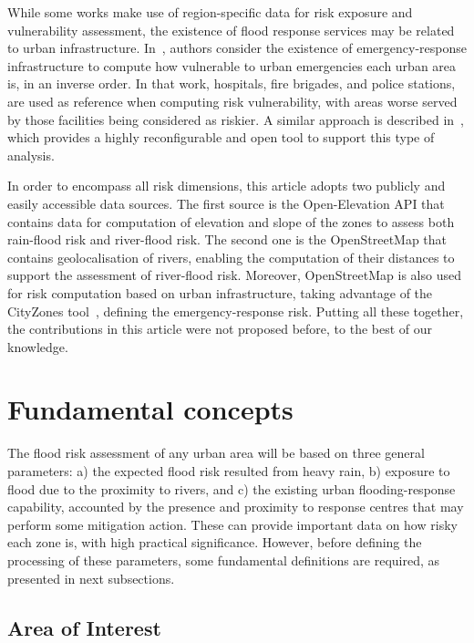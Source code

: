 \begin{refsection}
While some works make use of region-specific data for risk exposure and vulnerability assessment, the existence of flood response services may be related to urban infrastructure. In~\cite{sensorsposition}, authors consider the existence of emergency-response infrastructure to compute how vulnerable to urban emergencies each urban area is, in an inverse order. In that work, hospitals, fire brigades, and police stations, are used as reference when computing risk vulnerability, with areas worse served by those facilities being considered as riskier. A similar approach is described in~\cite{cityzones}, which provides a highly reconfigurable and open tool to support this type of analysis.

In order to encompass all risk dimensions, this article adopts two publicly and easily accessible data sources. The first source is the Open-Elevation API that contains data for computation of elevation and slope of the zones to assess both rain-flood risk and river-flood risk. The second one is the OpenStreetMap that contains geolocalisation of rivers, enabling the computation of their distances to support the assessment of river-flood risk. Moreover, OpenStreetMap is also used for risk computation based on urban infrastructure, taking advantage of the CityZones tool~\cite{cityzones}, defining the emergency-response risk. Putting all these together, the contributions in this article were not proposed before, to the best of our knowledge. 


\section{Fundamental concepts}\label{sec:fundamentals}

The flood risk assessment of any urban area will be based on three general parameters: a) the expected flood risk resulted from heavy rain, b) exposure to flood due to the proximity to rivers, and c) the existing urban flooding-response capability, accounted by the presence and proximity to response centres that may perform some mitigation action. These can provide important data on how risky each zone is, with high practical significance. However, before defining the processing of these parameters, some fundamental definitions are required, as presented in next subsections. 

\subsection{Area of Interest}


\end{refsection}
